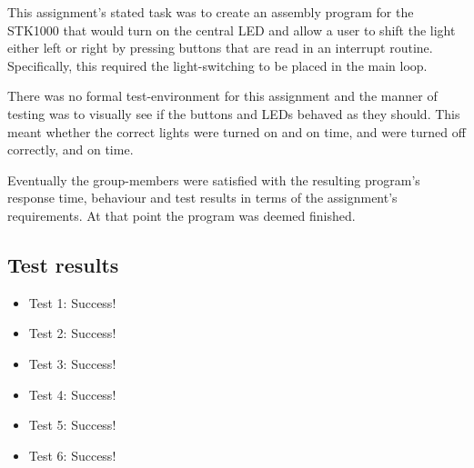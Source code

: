 This assignment’s stated task was to create an assembly program for the STK1000 that would turn on the central LED and allow a user to shift the light either left or right by pressing buttons that are read in an interrupt routine. Specifically, this required the light-switching to be placed in the main loop.

There was no formal test-environment for this assignment and the manner of testing was to visually see if the buttons and LEDs behaved as they should. This meant whether the correct lights were turned on and on time, and were turned off correctly, and on time. 

Eventually the group-members were satisfied with the resulting program’s response time, behaviour and test results in terms of the assignment’s requirements. At that point the program was deemed finished.

\subsection{Test results}
\begin{itemize}
\item Test 1: Success!
\item Test 2: Success!
\item Test 3: Success!
\item Test 4: Success!
\item Test 5: Success!
\item Test 6: Success!
\end{itemize}
